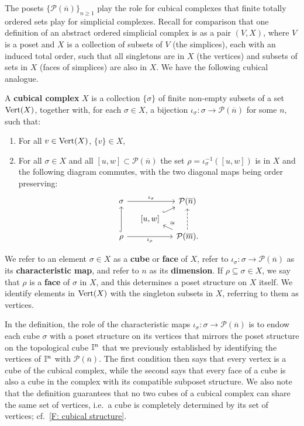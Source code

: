 The posets $\{\mathcal P(\overline n)\}_{n \geq 1}$ play the role for cubical complexes that finite totally ordered sets play for simplicial complexes.
Recall for comparison that one definition of an abstract ordered simplicial complex is as a pair $(V, X)$, where $V$ is a poset and $X$ is a collection of subsets of $V$ (the simplices), each with an induced total order, such that all singletons are in $X$ (the vertices) and subsets of sets in $X$ (faces of simplices) are also in $X$.
We have the following cubical analogue.

\begin{definition}\label{D:cubical}
	A \textbf{cubical complex} $X$ is a collection $\{ \sigma \}$ of finite non-empty subsets of a set
	${\rm Vert}(X)$, together with, for each $\sigma \in X$, a bijection $\iota_\sigma \colon \sigma \to \mathcal P(\overline n)$ for some $n$, such that:
	\begin{enumerate}
		\item For all $v \in {\rm Vert}(X)$, $\{v\} \in X$,
		\item For all $\sigma \in X$ and all $[u,w] \subset \mathcal P(\overline n)$ the set $\rho = \iota_\sigma^{-1}([u,w])$ is in $X$ and the following diagram commutes, with the two diagonal maps being order preserving:
		\begin{equation*}
			\begin{tikzcd} [row sep = tiny, column sep = small]
				\sigma \arrow[rr, "\iota_\sigma"] && \mathcal P(\overline n) \\
				& [-5pt] {[}u,w{]} \arrow[ur, hook] & \\
				\rho \arrow[uu, hook] \arrow[rr, "\iota_\rho"'] && \mathcal P(\overline m).
				\arrow[ul, "\cong"'] \arrow[uu, dashed]
			\end{tikzcd}
		\end{equation*}
	\end{enumerate}
	We refer to an element $\sigma \in X$ as a \textbf{cube} or \textbf{face} of $X$, refer to $\iota_\sigma \colon \sigma \to \mathcal P(\overline{n})$ as its \textbf{characteristic map},
	and refer to $n$ as its \textbf{dimension}.
	If $\rho \subseteq \sigma \in X$, we say that $\rho$ is a \textbf{face} of $\sigma$ in $X$, and this determines a poset structure on $X$ itself.
	We identify elements in ${\rm Vert}(X)$ with the singleton subsets in $X$, referring to them as vertices.
\end{definition}

In the definition, the role of the characteristic maps $\iota_\sigma \colon \sigma \to \mathcal P(\overline{n})$ is to endow each cube $\sigma$ with a poset structure on its vertices that mirrors the poset structure on the topological cube $\mathbb{I}^n$ that we previously established by identifying the vertices of $\mathbb{I}^n$ with $\mathcal P(\overline n)$.
The first condition then says that every vertex is a cube of the cubical complex, while the second says that every face of a cube is also a cube in the complex with its compatible subposet structure.
We also note that the definition guarantees that no two cubes of a cubical complex can share the same set of vertices, i.e.\ a cube is completely determined by its set of vertices; cf.\ \cref{F: cubical structure}.

